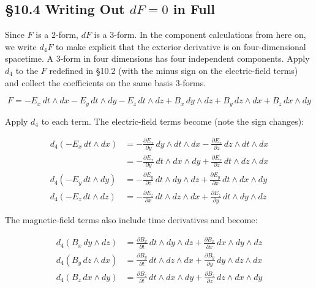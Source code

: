 \documentclass[a4paper,12pt,openany]{book}
\begin{document}
\par\vspace{0.35em}\par

\hypertarget{writing-out-df0-in-full}{%
\subsection{\texorpdfstring{§10.4 Writing Out \(dF=0\) in
Full}{§10.4 Writing Out dF=0 in Full}}\label{writing-out-df0-in-full}}

Since \(F\) is a \(2\)-form, \(dF\) is a \(3\)-form. In the component
calculations from here on, we write \(d_4F\) to make explicit that the
exterior derivative is on four-dimensional spacetime. A \(3\)-form in
four dimensions has four independent components. Apply \(d_4\) to the
\(F\) redefined in §10.2 (with the minus sign on the electric-field
terms) and collect the coefficients on the same basis \(3\)-forms.

\[F = -E_x\,dt\wedge dx - E_y\,dt\wedge dy - E_z\,dt\wedge dz + B_x\,dy\wedge dz + B_y\,dz\wedge dx + B_z\,dx\wedge dy\]

Apply \(d_4\) to each term. The electric-field terms become (note the
sign changes):

\[\begin{aligned}
d_4\!\left(-E_x\,dt\wedge dx\right) &= -\frac{\partial E_x}{\partial y}\,dy\wedge dt\wedge dx - \frac{\partial E_x}{\partial z}\,dz\wedge dt\wedge dx \\
&= -\frac{\partial E_x}{\partial y}\,dt\wedge dx\wedge dy + \frac{\partial E_x}{\partial z}\,dt\wedge dz\wedge dx \\
d_4\!\left(-E_y\,dt\wedge dy\right) &= -\frac{\partial E_y}{\partial z}\,dt\wedge dy\wedge dz + \frac{\partial E_y}{\partial x}\,dt\wedge dx\wedge dy \\
d_4\!\left(-E_z\,dt\wedge dz\right) &= -\frac{\partial E_z}{\partial x}\,dt\wedge dz\wedge dx + \frac{\partial E_z}{\partial y}\,dt\wedge dy\wedge dz
\end{aligned}\]

The magnetic-field terms also include time derivatives and become:

\[\begin{aligned}
d_4(B_x\,dy\wedge dz) &= \frac{\partial B_x}{\partial t}\,dt\wedge dy\wedge dz + \frac{\partial B_x}{\partial x}\,dx\wedge dy\wedge dz \\
d_4(B_y\,dz\wedge dx) &= \frac{\partial B_y}{\partial t}\,dt\wedge dz\wedge dx + \frac{\partial B_y}{\partial y}\,dy\wedge dz\wedge dx \\
d_4(B_z\,dx\wedge dy) &= \frac{\partial B_z}{\partial t}\,dt\wedge dx\wedge dy + \frac{\partial B_z}{\partial z}\,dz\wedge dx\wedge dy
\end{aligned}\]
\end{document}
